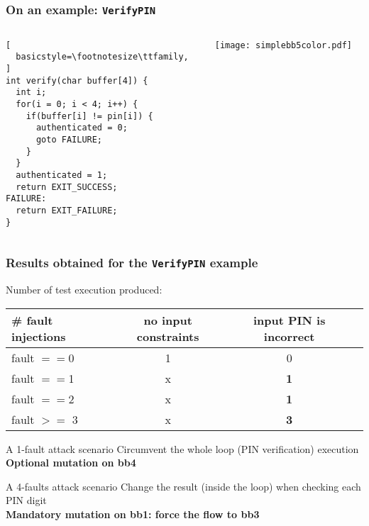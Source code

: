 \begin{frame}[fragile] \frametitle{On an example: {\tt VerifyPIN}}
\begin{columns}[t]
    \begin{column}{0.55\textwidth}\vspace{-18em}
\begin{lstlisting}[
  basicstyle=\footnotesize\ttfamily,
]
int verify(char buffer[4]) {
  int i;
  for(i = 0; i < 4; i++) {
    if(buffer[i] != pin[i]) {
      authenticated = 0;
      goto FAILURE;
    }
  }
  authenticated = 1;
  return EXIT_SUCCESS;
FAILURE:
  return EXIT_FAILURE;
}
\end{lstlisting}
\end{column}
\begin{column}{0.4\textwidth}
\texttt{[image: simplebb5color.pdf]} 
\end{column}
\end{columns}
\end{frame}

\begin{frame} \frametitle{Results obtained for the {\tt VerifyPIN} example}
\vfill
Number of test execution produced:
\begin{center}
\begin{tabular}{|l|c|c|c|}
\hline
 \# fault injections &  no input constraints   & input PIN is incorrect \\
\hline
fault $==$0 & 1    & 0   \\
\hline
fault $==$1 & x &  {\bf 1}  \\
\hline
fault $==$2 & x    &  {\bf 1}  \\
\hline
fault $>=$ 3 & x     &  {\bf 3}    \\
\hline
\end{tabular}
\end{center}
\vfill
\begin{block}{A 1-fault attack scenario}
Circumvent the whole loop (PIN verification) execution \\
{\bf Optional mutation on bb4}
\end{block}
\vfill
\begin{block}{A 4-faults attack scenario}
Change the result (inside the loop) when checking each PIN digit \\
{\bf Mandatory mutation on bb1: force the flow to bb3}
\end{block}
\vfill
\end{frame}

